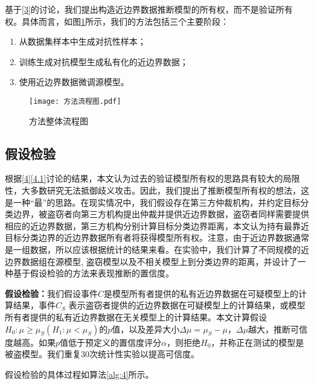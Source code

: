 基于\ref{3}的讨论，我们提出构造近边界数据推断模型的所有权，而不是验证所有权。具体而言，如图\ref{方法流程图}所示，我们的方法包括三个主要阶段：

\begin{enumerate}
	\renewcommand{\labelenumi}{\theenumi)}
	\item 从数据集样本中生成对抗性样本；
	\item 训练生成对抗模型生成私有化的近边界数据；
	\item 使用近边界数据微调源模型。
\end{enumerate}

\begin{figure}[htbp]%
	\centering
	\texttt{[image: 方法流程图.pdf]}
	\setlength{\abovecaptionskip}{5mm} %
	\caption{方法整体流程图}
	\label{方法流程图}
\end {figure}

\subsection{假设检验}\label{4.2.3}

根据\ref{4}\ref{4.1}讨论的结果，本文认为过去的验证模型所有权的思路具有较大的局限性，大多数研究无法抵御歧义攻击。因此，我们提出了推断模型所有权的想法，这是一种“最”的思路。在现实情况中，我们假设存在第三方仲裁机构，并约定目标分类边界，被盗窃者向第三方机构提出仲裁并提供近边界数据，盗窃者同样需要提供相应的近边界数据，第三方机构分别计算目标分类边界距离，本文认为持有最靠近目标分类边界的近边界数据所有者将获得模型所有权。注意，由于近边界数据通常是一组数据，所以应该根据统计的结果来看。在实验中，我们计算了不同规模的近边界数据组在源模型, 盗窃模型以及不相关模型上到分类边界的距离，并设计了一种基于假设检验的方法来表现推断的置信度。

\noindent\textbf{假设检验：}我们假设事件$C$是模型所有者提供的私有近边界数据在可疑模型上的计算结果，事件$C_S$ 表示盗窃者提供的近边界数据在可疑模型上的计算结果，或模型所有者提供的私有近边界数据在无关模型上的计算结果。本文计算假设$H_0:\mu \geq \mu_S(H_1:\mu < \mu_S)$的$p$值，以及差异大小$\Delta \mu = \mu_S - \mu$，$\Delta\mu$越大，推断可信度越高。如果$p$值低于预定义的置信度评分$\alpha$，则拒绝$H_0$，并称正在测试的模型是被盗模型。我们重复30次统计性实验以提高可信度。

假设检验的具体过程如算法\ref{alg:4}所示。

